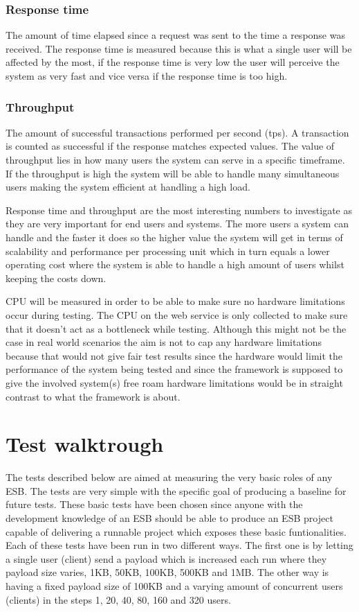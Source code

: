 \subsubsection{Response time}
The amount of time elapsed since a request was sent to the time a response was received. 
The response time is measured because this is what a single user will be affected by the most, if the response time is very low the user will perceive the system as very fast and vice versa if the response time is too high.

\newpage
\subsubsection{Throughput}
The amount of successful transactions performed per second (tps). A transaction is counted as successful if the response matches expected values.
The value of throughput lies in how many users the system can serve in a specific timeframe. If the throughput is high the system will be able to handle many simultaneous users making the system efficient at handling a high load.

Response time and throughput are the most interesting numbers to investigate as they are very important for end users and systems. 
The more users a system can handle and the faster it does so the higher value the system will get in terms of scalability and performance per processing unit which in turn equals a lower operating cost where the system is able to handle a high amount of users whilst keeping the costs down.

CPU will be measured in order to be able to make sure no hardware limitations occur during testing. 
The CPU on the web service is only collected to make sure that it doesn't act as a bottleneck while testing. 
Although this might not be the case in real world scenarios the aim is not to cap any hardware limitations because that would not give fair test results since the hardware would limit the performance of the system being tested and since the framework is supposed to give the involved system(s) free roam hardware limitations would be in straight contrast to what the framework is about.

\section{Test walktrough}
The tests described below are aimed at measuring the very basic roles of any ESB. 
The tests are very simple with the specific goal of producing a baseline for future tests. 
These basic tests have been chosen since anyone with the development knowledge of an ESB should be able to produce an ESB project capable of delivering a runnable project which exposes these basic funtionalities.
Each of these tests have been run in two different ways. The first one is by letting a single user (client) send a payload which is increased each run where they payload size varies, 1KB, 50KB, 100KB, 500KB and 1MB.
The other way is having a fixed payload size of 100KB and a varying amount of concurrent users (clients) in the steps 1, 20, 40, 80, 160 and 320 users.

